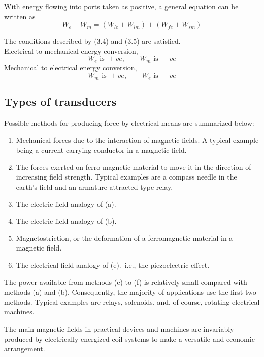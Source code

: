 \documentclass[a4paper,numbers=noenddot,12pt]{scrbook}
\begin{document}
With energy flowing into ports taken as positive, a general equation can be written as
\begin{equation}
    W_e + W_m = (W_{le}+ W_{lm}) + (W_{fe} + W_{sm})
    \label{eq_Eq3.6}
\end{equation}

The conditions described by (3.4) and (3.5) are satisfied.\\ Electrical to mechanical energy conversion,
\begin{equation*}
    W_e \text{\ is }+ve,\qquad W_m \text{\ is } -ve
\end{equation*}
Mechanical to electrical energy conversion,
\begin{equation*}
     W_m \text{\ is }+ve,\qquad W_e \text{\ is } -ve
\end{equation*}

\subsection{Types of transducers} Possible methods for producing force by electrical means are summarized below:
\begin{enumerate}[label={(\alph*)}, leftmargin=*]
    \item Mechanical forces due to the interaction of magnetic fields. A typical example being a current-carrying conductor in a magnetic field.
    \item The forces exerted on ferro-magnetic material to move it in the direction of increasing field strength. Typical examples are a compass needle in the earth's field and an armature-attracted type relay.
    \item The electric field analogy of (a).
    \item The electric field analogy of (b).
    \item Magnetostriction, or the deformation of a ferromagnetic material in a magnetic field.
    \item The electrical field analogy of (e).\ i.e., the piezoelectric effect.
\end{enumerate}

The power available from methods (c) to (f) is relatively small compared with methods (a) and (b). Consequently, the majority of applications use the first two methods. Typical examples are relays, solenoids, and, of course, rotating electrical machines. 

The main magnetic fields in practical devices and machines are invariably produced by electrically energized coil systems to make a versatile and economic arrangement. 
\end{document}
